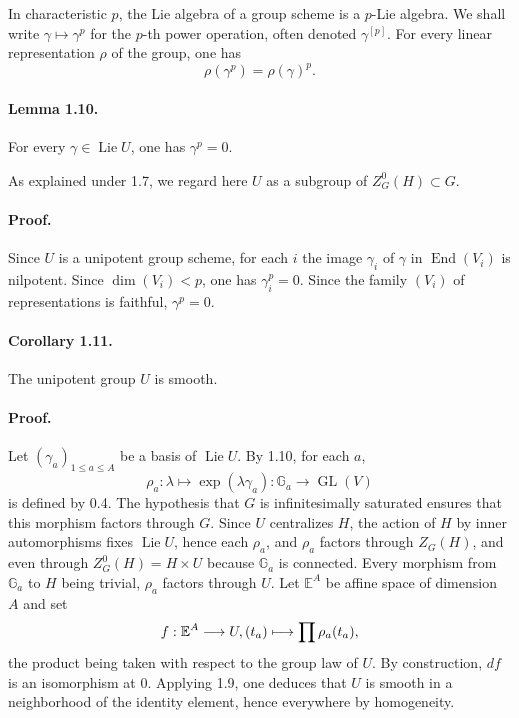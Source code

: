 \documentclass[11pt]{article}
\newcommand{\Ga}{\mathbb{G}_a}
\newcommand{\Lie}{\operatorname{Lie}}
\newcommand{\GL}{\operatorname{GL}}
\newcommand{\End}{\operatorname{End}}
\theoremstyle{plain}
\theoremstyle{definition}
\begin{document}
In characteristic $p$, the Lie algebra of a group scheme is a $p$-Lie algebra. We shall write $\gamma\mapsto\gamma^p$ for the $p$-th power operation, often denoted $\gamma^{[p]}$. For every linear representation $\rho$ of the group, one has
\[
   \rho(\gamma^p)=\rho(\gamma)^p.
\]

\paragraph{Lemma 1.10.} For every $\gamma\in\Lie U$, one has $\gamma^p=0$.

As explained under 1.7, we regard here $U$ as a subgroup of $Z^0_G(H)\subset G$.

\paragraph{Proof.} Since $U$ is a unipotent group scheme, for each $i$ the image $\gamma_i$ of $\gamma$ in $\End(V_i)$ is nilpotent. Since $\dim(V_i)<p$, one has $\gamma_i^p=0$. Since the family $(V_i)$ of representations is faithful, $\gamma^p=0$.

\paragraph{Corollary 1.11.} The unipotent group $U$ is smooth.

\paragraph{Proof.} Let $(\gamma_a)_{1\le a\le A}$ be a basis of $\Lie U$. By 1.10, for each $a$,
\[
   \rho_a:\lambda\longmapsto \exp(\lambda\gamma_a):\Ga\longrightarrow \GL(V)
\]
is defined by 0.4. The hypothesis that $G$ is infinitesimally saturated ensures that this morphism factors through $G$. Since $U$ centralizes $H$, the action of $H$ by inner automorphisms fixes $\Lie U$, hence each $\rho_a$, and $\rho_a$ factors through $Z_G(H)$, and even through $Z^0_G(H)=H\times U$ because $\Ga$ is connected. Every morphism from $\Ga$ to $H$ being trivial, $\rho_a$ factors through $U$. Let $\mathbb E^A$ be affine space of dimension $A$ and set
\[
   f:\mathbb E^A\longrightarrow U,\\ (t_a)\longmapsto \prod \rho_a(t_a),
\]
the product being taken with respect to the group law of $U$. By construction, $df$ is an isomorphism at $0$. Applying 1.9, one deduces that $U$ is smooth in a neighborhood of the identity element, hence everywhere by homogeneity.
\end{document}
